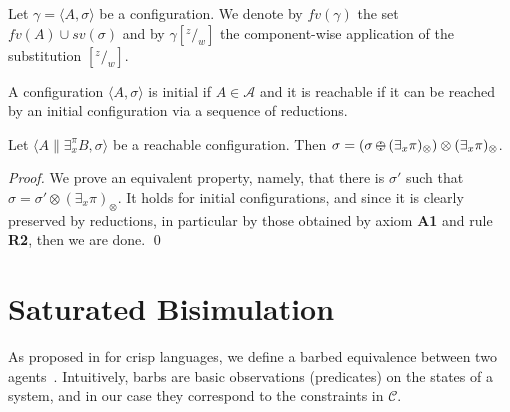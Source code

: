 \documentclass{llncs}
\def\odiv{\, {\ominus\hspace{-7.7pt} \div} \,}
\begin{document}
Let $\gamma = \langle A, \sigma \rangle$ be a configuration.
%
We denote by $fv(\gamma)$ the set $fv(A) \cup sv(\sigma)$ and by
$\gamma[^z/_w]$ the component-wise application of the substitution $[^z/_w]$.

\begin{definition}
A configuration $\langle A, \sigma \rangle$ is initial if $A\in \mathcal{A}$
and it is reachable if it can be reached by an initial configuration via a sequence of 
reductions.
\end{definition}

\begin{lemma}[On monotonicity, II]
\label{mono2}
Let $\langle A \parallel \exists_x^\pi B, \sigma \rangle$ 
be a reachable configuration.
Then $\sigma = (\sigma \odiv (\exists_x \pi)_\otimes) \otimes (\exists_x \pi)_\otimes$.
\end{lemma}

\begin{proof}
We prove an equivalent property, namely, that there is $\sigma'$ such that 
$\sigma = \sigma' \otimes (\exists_x \pi)_\otimes$. 
%
It holds for initial configurations, and since it is clearly preserved by reductions, 
in particular by those obtained by axiom \mbox{\bf A1} and rule \mbox{\bf R2},
then we are done.
\qed
%
\end{proof}


\section{Saturated Bisimulation}\label{sec:saturated}
As proposed in \cite{pippo} for crisp languages, we define a barbed equivalence between two agents~\cite{barbed}.  
%
Intuitively, barbs are basic observations (predicates) on the states of a system, and in our case they correspond 
to the constraints in $\mathcal{C}$.
\end{document}
